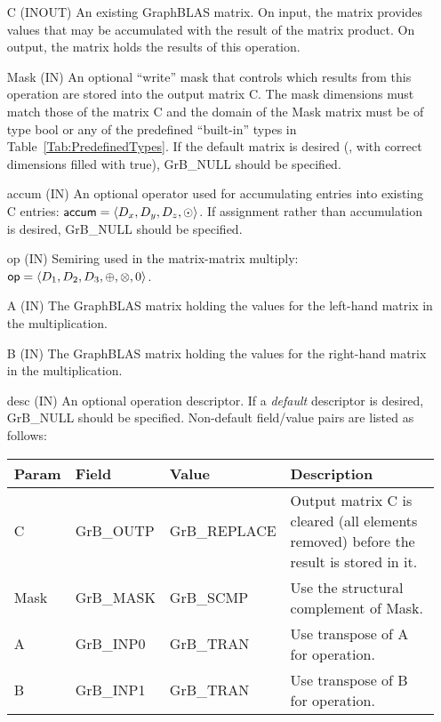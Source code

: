 \begin{itemize}[leftmargin=1.1in]
    \item[{\sf C}]    ({\sf INOUT}) An existing GraphBLAS matrix. On
    input, the matrix provides values that may be accumulated with the
    result of the matrix product.   On output, the matrix holds the
    results of this operation.

    \item[{\sf Mask}] ({\sf IN}) An optional ``write'' mask that controls which
    results from this operation are stored into the output matrix {\sf C}. The 
    mask dimensions must match those of the matrix {\sf C} and the domain of the 
    {\sf Mask} matrix must be of type {\sf bool} or any of the predefined 
    ``built-in'' types in Table~\ref{Tab:PredefinedTypes}.  If the default
    matrix is desired (\ie, with correct dimensions filled with {\sf true}), 
    {\sf GrB\_NULL} should be specified.

    \item[{\sf accum}] ({\sf IN}) An optional operator used for accumulating
    entries into existing {\sf C} entries: ${\sf accum} = \langle D_x,
    D_y, D_z,\odot \rangle$. If assignment rather than accumulation is
    desired, {\sf GrB\_NULL} should be specified.

    \item[{\sf op}]   ({\sf IN}) Semiring used in the matrix-matrix
    multiply: ${\sf op}=\langle D_1,D_2,D_3,\oplus,\otimes,0 \rangle$.

    \item[{\sf A}]    ({\sf IN}) The GraphBLAS matrix holding the values
    for the left-hand matrix in the multiplication.

    \item[{\sf B}]    ({\sf IN}) The GraphBLAS matrix holding the values
    for the right-hand matrix in the multiplication.

    \item[{\sf desc}] ({\sf IN}) An optional operation descriptor. If
    a \emph{default} descriptor is desired, {\sf GrB\_NULL} should be
    specified. Non-default field/value pairs are listed as follows:  \\

    \begin{tabular}{lllp{2.5in}}
    Param   & Field           & Value               & Description \\ \hline
    {\sf C}    & {\sf GrB\_OUTP} & {\sf GrB\_REPLACE}  & Output matrix {\sf C} is cleared (all elements removed) before the result is stored in it. \\
    {\sf Mask} & {\sf GrB\_MASK} & {\sf GrB\_SCMP}     & Use the structural complement of {\sf Mask}. \\
    {\sf A}    & {\sf GrB\_INP0} & {\sf GrB\_TRAN}     & Use transpose of {\sf A} for operation. \\
    {\sf B}    & {\sf GrB\_INP1} & {\sf GrB\_TRAN}     & Use transpose of {\sf B} for operation. \\
    \end{tabular}
\end{itemize}

